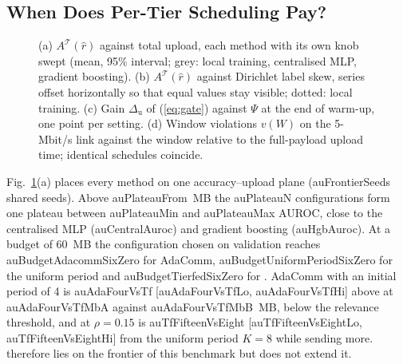 \subsection{When Does Per-Tier Scheduling Pay?}
\label{sec:results-arch}

\begin{figure}[t]
\centering{}
\caption{(a) $A^{\mathcal T}(\hat r)$ against total upload, each method with its own knob swept (mean, 95\% interval; grey: local training, centralised MLP, gradient boosting). (b) $A^{\mathcal T}(\hat r)$ against Dirichlet label skew, series offset horizontally so that equal values stay visible; dotted: local training. (c) Gain $\Delta_{\mathrm u}$ of (\ref{eq:gate}) against $\Psi$ at the end of warm-up, one point per setting. (d) Window violations $v(W)$ on the 5-Mbit/s link against the window relative to the full-payload upload time; identical schedules coincide.}
\label{fig:au}
\end{figure}

\begin{table}[t]
\caption{Primary contrast (\ref{eq:gate}): \tierfed{} ($\rho=0.25$) against the best uniform period at matched bytes. $\Psi$ at the end of warm-up; $\mathbf K$: \tierfed{}'s intervals (slow, medium) in the first round after warm-up, most frequent over seeds; MB over 60 rounds; gain $\Delta_{\mathrm u}$ with bootstrap 95\% interval and Wilcoxon $p$}
\label{tab:gate}
\centering\footnotesize
{}
\end{table}
Fig.~\ref{fig:au}(a) places every method on one accuracy--upload plane (\num{auFrontierSeeds} shared seeds). Above \num{auPlateauFrom}~MB the \num{auPlateauN} configurations form one plateau between \num{auPlateauMin} and \num{auPlateauMax} AUROC, close to the centralised MLP (\num{auCentralAuroc}) and gradient boosting (\num{auHgbAuroc}). At a budget of 60~MB the configuration chosen on validation reaches \num{auBudgetAdacommSixZero} for AdaComm, \num{auBudgetUniformPeriodSixZero} for the uniform period and \num{auBudgetTierfedSixZero} for \tierfed{}. AdaComm with an initial period of 4 is \num{auAdaFourVsTf} [\num{auAdaFourVsTfLo}, \num{auAdaFourVsTfHi}] above \tierfed{} at \num{auAdaFourVsTfMbA} against \num{auAdaFourVsTfMbB}~MB, below the relevance threshold, and \tierfed{} at $\rho=0.15$ is \num{auTfFifteenVsEight} [\num{auTfFifteenVsEightLo}, \num{auTfFifteenVsEightHi}] from the uniform period $K=8$ while sending more. \tierfed{} therefore lies on the frontier of this benchmark but does not extend it.

